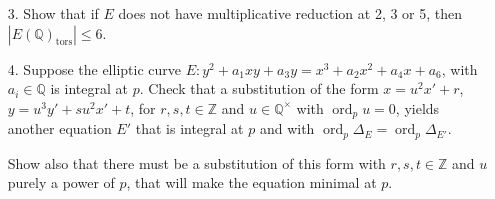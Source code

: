 \documentclass[a4paper]{article}
\theoremstyle{definition}
\DeclareMathOperator{\ord}{ord}
\newcommand{\tors}{\mathrm{tors}}
\renewcommand{\O}{\mathcal{O}}
\newcommand{\F}{\mathbb{F}}
\newcommand{\Z}{\mathbb{Z}}
\newcommand{\Q}{\mathbb{Q}}
\begin{document}
\begin{enumerate}
        \begin{proof}[Solution]
            Using the formula for the discriminant, we have $a_1=a_2=a_6=0$ and
            $a_3=-a_4=1$, so
            \begin{equation*}
                b_2 = 0 + 0, b_4 = -2 + 0, b_6 = 1 + 0, b_8 = 0 + 0 + 0 - 1,
            \end{equation*}
            giving $\Delta_E=0+8(2^3)-27+0=37$. Hence we have good reduction at
            both 2 and 3. Now
            \begin{align*}
                \tilde E(\F_2)
                    &= \{\O\}\cup\{(x,y)\in\F_2^2:y^2+y=x^3+x\} \\
                    &= \{\O\}\cup\F_2^2
            \end{align*}
            since $y^2+y=0=x^3+x$ for $x,y\in\F_2$, so we get
            $\tilde E(\F_2)\cong C_5$. Also
            \begin{align*}
                \tilde E(\F_3)
                    &= \{\O\}\cup\{(x,y)\in\F_3^2:y(y+1)=x^3-x\} \\
                    &= \{\O\}\cup\bigl(\{0,-1\}\times\F_3\bigr)
            \end{align*}
            since $x^3-x=0$ for $x\in\F_3$, so we get $\tilde E(\F_3)\cong C_7$.
            Hence by Corollary 38 we have only 2-torsion;
            $E(\Q)_\tors=E(\Q)_\tors[2]$. But the points of order 2 are given by
            $y=-\frac{1}{2}$ and $x^3-x-\frac{1}{4}=0$, and this cubic in $x$
            has no rational roots. Therefore $E(\Q)_\tors$ is trivial, so the
            point $(0,-1)\in E(\Q)$ is non-torsion, and hence $E(\Q)$ is
            infinite.
        \end{proof}

    \item[3.] Show that if $E$ does not have multiplicative reduction at 2, 3 or
        5, then $|E(\Q)_\tors|\le6$.

    \item[4.] Suppose the elliptic curve $E:y^2+a_1xy+a_3y=x^3+a_2x^2+a_4x+a_6$,
        with $a_i\in\Q$ is integral at $p$. Check that a substitution of the
        form $x=u^2x'+r$, $y=u^3y'+su^2x'+t$, for $r,s,t\in\Z$ and
        $u\in\Q^\times$ with $\ord_pu=0$, yields another equation $E'$ that is
        integral at $p$ and with $\ord_p\Delta_E=\ord_p\Delta_{E'}$.

        Show also that there must be a substitution of this form with
        $r,s,t\in\Z$ and $u$ purely a power of $p$, that will make the equation
        minimal at $p$.


\end{enumerate}
\end{document}

